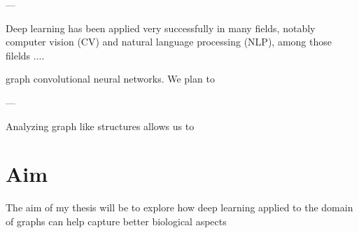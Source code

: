 \documentclass{article}
\begin{document}
---

Deep learning has been applied very successfully in many fields, notably computer vision
 (CV) and natural language processing (NLP), among those filelds .... 
 
 graph convolutional neural networks. We plan to 

---

Analyzing graph like structures allows us to 



    
\section*{Aim}

The aim of my thesis will be to explore how deep learning applied to the domain of
graphs can help capture better biological aspects 








\end{document}
